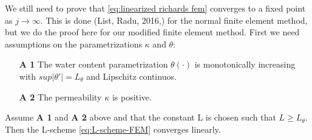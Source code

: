 \documentclass[../Main/main.tex]{subfiles}
\begin{document}
	We still need to prove that \eqref{eq:linearized richards fem} converges to a fixed point as $j\rightarrow \infty$. This is done (List, Radu, 2016,\cite{list2016study}) for the normal finite element method, but we do the proof here for our modified finite element method. 
	First we need assumptions on the parametrizations $\kappa $ and $\theta$:
	\begin{itemize}
		\item[\textbf{A 1}] The water content parametrization $\theta(\cdot)$ is monotonically increasing with $sup|\theta'| = L_{\theta}$ and Lipschitz continuos.
		\item[\textbf{A 2}] The permeability $\kappa$ is positive. 
	\end{itemize}
	\begin{theorem}
		Assume \textbf{A 1} and \textbf{A 2} above and that the constant L is chosen such that $L \geq L_{\theta}$. Then the L-scheme \eqref{eq:L-scheme-FEM} converges linearly. 
	\end{theorem}
\end{document}
